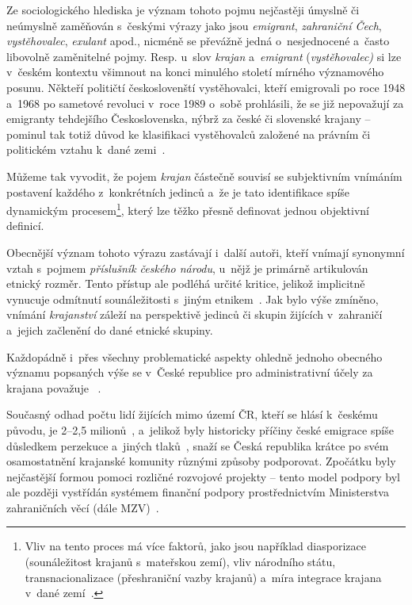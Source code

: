 Ze sociologického hlediska je význam tohoto pojmu nejčastěji úmyslně či neúmyslně zaměňován s~českými výrazy jako jsou \emph{emigrant}, \emph{zahraniční Čech}, \emph{vystěhovalec}, \emph{exulant} apod., nicméně se převážně jedná o~nesjednocené a~často libovolně zaměnitelné pojmy. Resp. u~slov \emph{krajan} a~\emph{emigrant} (\emph{vystěhovalec)} si lze v~českém kontextu všimnout na konci minulého století mírného významového posunu. Někteří političtí českoslovenští vystěhovalci, kteří emigrovali po roce 1948 a~1968 po sametové revoluci v~roce 1989 o~sobě prohlásili, že se již nepovažují za emigranty tehdejšího Československa, nýbrž za české či slovenské krajany -- pominul tak totiž důvod ke klasifikaci vystěhovalců založené na právním či politickém vztahu k~dané zemi~\parencite{Broucek2017}.

Můžeme tak vyvodit, že pojem \emph{krajan} částečně souvisí se subjektivním vnímáním postavení každého z~konkrétních jedinců a~že je tato identifikace spíše dynamickým procesem\footnote{Vliv na tento proces má více faktorů, jako jsou například diasporizace (sounáležitost krajanů s~mateřskou zemí), vliv národního státu, transnacionalizace (přeshraniční vazby krajanů) a~míra integrace krajana v~dané zemí~\parencite{Broucek2017}.}, který lze těžko přesně definovat jednou objektivní definicí.

Obecnější význam tohoto výrazu zastávají i~další autoři, kteří vnímají synonymní vztah s~pojmem \emph{příslušník českého národu}, u~nějž je primárně artikulován etnický rozměr. Tento přístup ale podléhá určité kritice, jelikož implicitně vynucuje odmítnutí sounáležitosti s~jiným etnikem~\parencite{Jakoubek2015}. Jak bylo výše zmíněno, vnímání \emph{krajanství} záleží na perspektivě jedinců či skupin žijících v~zahraničí a~jejich začlenění do dané etnické skupiny.

Každopádně i~přes všechny problematické aspekty ohledně jednoho obecného významu popsaných výše se v~České republice pro administrativní účely za krajana považuje ~\parencite{Krajane-mv1}.

Současný odhad počtu lidí žijících mimo území ČR, kteří se hlásí k~českému původu, je 2--2,5 milionů~\parencite{Krajane-mv2}, a~jelikož byly historicky příčiny české emigrace spíše důsledkem perzekuce a~jiných tlaků~\parencite{Vaculik2009a}, snaží se Česká republika krátce po svém osamostatnění krajanské komunity různými způsoby podporovat. Zpočátku byly nejčastější formou pomoci rozličné rozvojové projekty -- tento model podpory byl ale později vystřídán systémem finanční podpory prostřednictvím Ministerstva zahraničních věcí (dále MZV)~\parencite{Broucek2009}.


